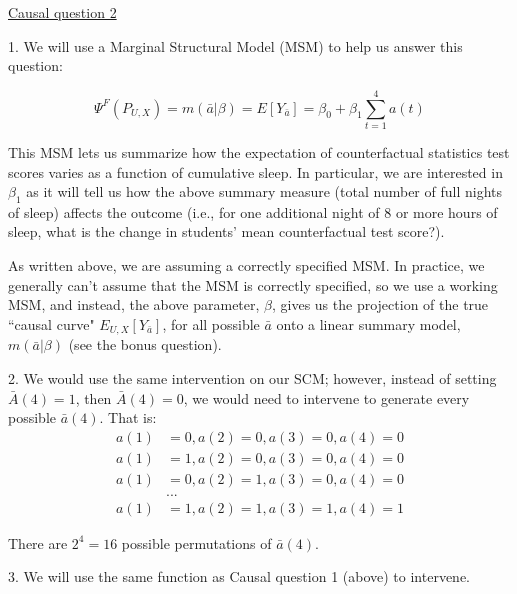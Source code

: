 \documentclass[answers]{exam}
\begin{document}
\begin{solution}
\noindent\underline{Causal question 2}

1. We will use a Marginal Structural Model (MSM) to help us answer this question:

\[
\Psi^F(P_{U,X}) = m(\bar{a}|\beta) = E[Y_{\bar{a}}] = \beta_0 + \beta_1 \sum_{t=1}^4a(t)
\]

This MSM lets us summarize how the expectation of counterfactual statistics test scores varies as a function of cumulative sleep. In particular, we are interested in $\beta_1$ as it will tell us how the above summary measure (total number of full nights of sleep) affects the outcome (i.e., for one additional night of 8 or more hours of sleep, what is the change in students' mean counterfactual test score?).

As written above, we are assuming a correctly specified MSM. In practice, we generally can't assume that the MSM is correctly specified, so we use a working MSM, and instead, the above parameter, $\beta$, gives us the projection of the true ``causal curve" $E_{U,X}[Y_{\bar{a}}]$, for all possible $\bar{a}$ onto a linear summary model, $m(\bar{a}|\beta)$ (see the bonus question).

2. We would use the same intervention on our SCM; however, instead of setting $\bar{A}(4) = 1$, then $\bar{A}(4)=0$, we would need to intervene to generate every possible $\bar{a}(4)$. That is:
\begin{align*}
a(1) & = 0, a(2) = 0, a(3) = 0, a(4) = 0 \\
a(1) & = 1, a(2) = 0, a(3) = 0, a(4) = 0 \\
a(1) & = 0, a(2) = 1, a(3) = 0, a(4) = 0 \\
& ... \\
a(1) & = 1, a(2) = 1, a(3) = 1, a(4) = 1
\end{align*}

There are $2^{4} = 16$ possible permutations of $\bar{a}(4)$.


3. We will use the same function as Causal question 1 (above) to intervene.


\end{solution}
\end{document}
